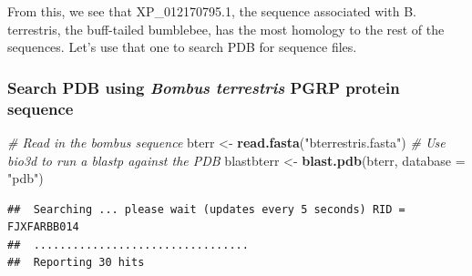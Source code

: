 \documentclass[]{article}
\newenvironment{Shaded}{\begin{snugshade}}{\end{snugshade}}
\newcommand{\KeywordTok}[1]{\textcolor[rgb]{0.13,0.29,0.53}{\textbf{#1}}}
\newcommand{\DataTypeTok}[1]{\textcolor[rgb]{0.13,0.29,0.53}{#1}}
\newcommand{\StringTok}[1]{\textcolor[rgb]{0.31,0.60,0.02}{#1}}
\newcommand{\CommentTok}[1]{\textcolor[rgb]{0.56,0.35,0.01}{\textit{#1}}}
\newcommand{\OperatorTok}[1]{\textcolor[rgb]{0.81,0.36,0.00}{\textbf{#1}}}
\newcommand{\NormalTok}[1]{#1}
\begin{document}
From this, we see that XP\_012170795.1, the sequence associated with B.
terrestris, the buff-tailed bumblebee, has the most homology to the rest
of the sequences. Let's use that one to search PDB for sequence files.

\subsubsection{\texorpdfstring{Search PDB using \emph{Bombus terrestris}
PGRP protein
sequence}{Search PDB using Bombus terrestris PGRP protein sequence}}\label{search-pdb-using-bombus-terrestris-pgrp-protein-sequence}

\begin{Shaded}
\begin{Highlighting}[]
\CommentTok{# Read in the bombus sequence}
\NormalTok{bterr <-}\StringTok{ }\KeywordTok{read.fasta}\NormalTok{(}\StringTok{"bterrestris.fasta"}\NormalTok{)}
\CommentTok{# Use bio3d to run a blastp against the PDB}
\NormalTok{blastbterr <-}\StringTok{ }\KeywordTok{blast.pdb}\NormalTok{(bterr, }\DataTypeTok{database =} \StringTok{"pdb"}\NormalTok{)}
\end{Highlighting}
\end{Shaded}

\begin{verbatim}
##  Searching ... please wait (updates every 5 seconds) RID = FJXFARBB014 
##  .................................
##  Reporting 30 hits
\end{verbatim}

\begin{Shaded}
\end{Shaded}
\end{document}
